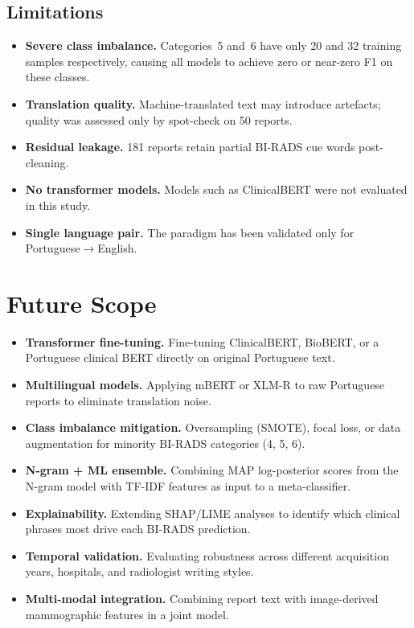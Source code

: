 \documentclass[11pt,a4paper]{article}
\begin{document}
\subsection{Limitations}

\begin{itemize}
  \item \textbf{Severe class imbalance.} Categories~5 and~6 have only 20 and
        32 training samples respectively, causing all models to achieve zero
        or near-zero F1 on these classes.
  \item \textbf{Translation quality.} Machine-translated text may introduce
        artefacts; quality was assessed only by spot-check on 50 reports.
  \item \textbf{Residual leakage.} 181 reports retain partial BI-RADS cue
        words post-cleaning.
  \item \textbf{No transformer models.} Models such as ClinicalBERT were not
        evaluated in this study.
  \item \textbf{Single language pair.} The paradigm has been validated only for
        Portuguese$\to$English.
\end{itemize}

\section{Future Scope}

\begin{itemize}
  \item \textbf{Transformer fine-tuning.} Fine-tuning ClinicalBERT, BioBERT,
        or a Portuguese clinical BERT directly on original Portuguese text.
  \item \textbf{Multilingual models.} Applying mBERT or XLM-R to raw
        Portuguese reports to eliminate translation noise.
  \item \textbf{Class imbalance mitigation.} Oversampling (SMOTE), focal loss,
        or data augmentation for minority BI-RADS categories (4, 5, 6).
  \item \textbf{N-gram + ML ensemble.} Combining MAP log-posterior scores from
        the N-gram model with TF-IDF features as input to a meta-classifier.
  \item \textbf{Explainability.} Extending SHAP/LIME analyses to identify
        which clinical phrases most drive each BI-RADS prediction.
  \item \textbf{Temporal validation.} Evaluating robustness across different
        acquisition years, hospitals, and radiologist writing styles.
  \item \textbf{Multi-modal integration.} Combining report text with
        image-derived mammographic features in a joint model.
\end{itemize}
\end{document}
